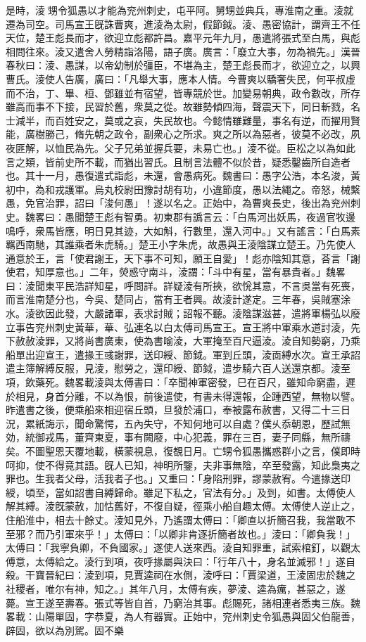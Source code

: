 \begin{pinyinscope}
是時，淩򠐁甥令狐愚以才能為兖州刺史，屯平阿。舅甥並典兵，專淮南之重。淩就遷為司空。司馬宣王旣誅曹爽，進淩為太尉，假節鉞。淩、愚密協計，謂齊王不任天位，楚王彪長而才，欲迎立彪都許昌。嘉平元年九月，愚遣將張式至白馬，與彪相問往來。淩又遣舍人勞精詣洛陽，語子廣。廣言：「廢立大事，勿為禍先。」漢晉春秋曰：淩、愚謀，以帝幼制於彊臣，不堪為主，楚王彪長而才，欲迎立之，以興曹氏。淩使人告廣，廣曰：「凡舉大事，應本人情。今曹爽以驕奢失民，何平叔虛而不治，丁、畢、桓、鄧雖並有宿望，皆專競於世。加變易朝典，政令數改，所存雖高而事不下接，民習於舊，衆莫之從。故雖勢傾四海，聲震天下，同日斬戮，名士減半，而百姓安之，莫或之哀，失民故也。今懿情雖難量，事名有逆，而擢用賢能，廣樹勝己，脩先朝之政令，副衆心之所求。爽之所以為惡者，彼莫不必改，夙夜匪解，以恤民為先。父子兄弟並握兵要，未易亡也。」淩不從。臣松之以為如此言之類，皆前史所不載，而猶出習氏。且制言法體不似於昔，疑悉鑿齒所自造者也。其十一月，愚復遣式詣彪，未還，會愚病死。魏書曰：愚字公浩，本名浚，黃初中，為和戎護軍。烏丸校尉田豫討胡有功，小違節度，愚以法繩之。帝怒，械繫愚，免官治罪，詔曰「浚何愚」！遂以名之。正始中，為曹爽長史，後出為兖州刺史。魏畧曰：愚聞楚王彪有智勇。初東郡有譌言云：「白馬河出妖馬，夜過官牧邊鳴呼，衆馬皆應，明日見其迹，大如斛，行數里，還入河中。」又有謠言：「白馬素羈西南馳，其誰乘者朱虎騎。」楚王小字朱虎，故愚與王淩陰謀立楚王。乃先使人通意於王，言「使君謝王，天下事不可知，願王自愛」！彪亦陰知其意，荅言「謝使君，知厚意也。」二年，熒惑守南斗，淩謂：「斗中有星，當有暴貴者。」魏畧曰：淩聞東平民浩詳知星，呼問詳。詳疑淩有所挾，欲恱其意，不言吳當有死喪，而言淮南楚分也，今吳、楚同占，當有王者興。故淩計遂定。三年春，吳賊塞涂水。淩欲因此發，大嚴諸軍，表求討賊；詔報不聽。淩陰謀滋甚，遣將軍楊弘以廢立事告兖州刺史黃華，華、弘連名以白太傅司馬宣王。宣王將中軍乘水道討淩，先下赦赦淩罪，又將尚書廣東，使為書喻淩，大軍掩至百尺逼淩。淩自知勢窮，乃乘船單出迎宣王，遣掾王彧謝罪，送印綬、節鉞。軍到丘頭，淩靣縛水次。宣王承詔遣主簿解縛反服，見淩，慰勞之，還印綬、節鉞，遣步騎六百人送還京都。淩至項，飲藥死。魏畧載淩與太傅書曰：「卒聞神軍密發，巳在百尺，雖知命窮盡，遲於相見，身首分離，不以為恨，前後遣使，有書未得還報，企踵西望，無物以譬。昨遣書之後，便乘船來相迎宿丘頭，旦發於浦口，奉被露布赦書，又得二十三日況，累紙誨示，聞命驚愕，五內失守，不知何地可以自處？僕乆忝朝恩，歷試無効，統御戎馬，董齊東夏，事有闕廢，中心犯義，罪在三百，妻子同縣，無所禱矣。不圖聖恩天覆地載，橫蒙視息，復覩日月。亡甥令狐愚攜惑群小之言，僕即時呵抑，使不得竟其語。旣人已知，神明所鑒，夫非事無陰，卒至發露，知此梟夷之罪也。生我者父母，活我者子也。」又重曰：「身陷刑罪，謬蒙赦宥。今遣掾送印綬，頃至，當如詔書自縛歸命。雖足下私之，官法有分。」及到，如書。太傅使人解其縛。淩旣蒙赦，加怙舊好，不復自疑，徑乘小船自趣太傅。太傅使人逆止之，住船淮中，相去十餘丈。淩知見外，乃遙謂太傅曰：「卿直以折簡召我，我當敢不至邪？而乃引軍來乎！」太傅曰：「以卿非肯逐折簡者故也。」淩曰：「卿負我！」太傅曰：「我寧負卿，不負國家。」遂使人送來西。淩自知罪重，試索棺釘，以觀太傅意，太傅給之。淩行到項，夜呼掾屬與決曰：「行年八十，身名並滅邪！」遂自殺。干寶晉紀曰：淩到項，見賈逵祠在水側，淩呼曰：「賈梁道，王淩固忠於魏之社稷者，唯尔有神，知之。」其年八月，太傅有疾，夢淩、逵為癘，甚惡之，遂薨。宣王遂至壽春。張式等皆自首，乃窮治其事。彪賜死，諸相連者悉夷三族。魏畧載：山陽單固，字恭夏，為人有器實。正始中，兖州刺史令狐愚與固父伯龍善，辟固，欲以為別駕。固不樂
\end{pinyinscope}
